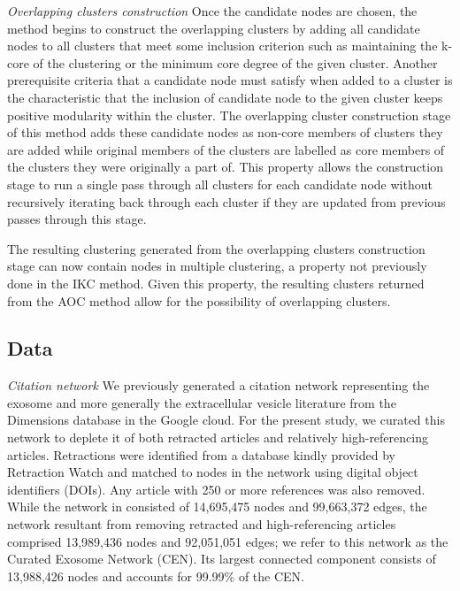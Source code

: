 \documentclass[12pt, oneside]{article}   	%
\begin{document}
	\emph{Overlapping clusters construction} Once the candidate nodes are chosen, the method begins to construct the overlapping clusters by adding all candidate nodes to all clusters that meet some inclusion criterion such as maintaining the k-core of the clustering or the minimum core degree of the given cluster. Another prerequisite criteria that a candidate node must satisfy when added to a cluster is the characteristic that the inclusion of candidate node to the given cluster keeps positive modularity within the cluster. The overlapping cluster construction stage of this method adds these candidate nodes as non-core members of clusters they are added while original members of the clusters are labelled as core members of the clusters they were originally a part of. This property allows the construction stage to run a single pass through all clusters for each candidate node without recursively iterating back through each cluster if they are updated from previous passes through this stage.
	
	The resulting clustering generated from the overlapping clusters construction stage can now contain nodes in multiple clustering, a property not previously done in the IKC method. Given this property, the resulting clusters returned from the AOC method allow for the possibility of overlapping clusters. 
	
	\subsection{Data} 
	\emph{Citation network} We previously generated a citation network \citep{Wedell2022} representing the exosome \citep{harding1983} and more generally the extracellular vesicle literature \citep{raposo2021} from the Dimensions database \citep{hook2018dimensions} in the Google cloud. For the present study, we curated this network to deplete it of both retracted articles and relatively high-referencing articles. 
	Retractions were identified from a database kindly provided by Retraction Watch and matched to nodes in the network using digital object identifiers (DOIs). Any article with 250 or more references was also removed. 
	While the network in \cite{Wedell2022} consisted of 14,695,475 nodes and 99,663,372 edges, the network resultant from removing retracted and high-referencing articles comprised 13,989,436 nodes and 92,051,051 edges; we refer to this network as the Curated Exosome Network (CEN). Its largest connected component consists of 13,988,426 nodes and accounts for 99.99\% of the CEN.
	
\end{document}
